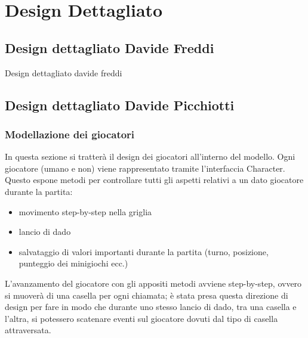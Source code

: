 \documentclass[a4paper,12pt]{report}
\begin{document}
	\section{Design Dettagliato}
	\subsection{Design dettagliato Davide Freddi}
	Design dettagliato davide freddi
	\subsection{Design dettagliato Davide Picchiotti}
	\subsubsection{Modellazione dei giocatori}
	In questa sezione si tratterà il design dei giocatori all'interno del modello.\newline
	\newline
	Ogni giocatore (umano e non) viene rappresentato tramite l'interfaccia Character.
	Questo espone metodi per controllare tutti gli aspetti relativi a un dato giocatore durante la partita:
	\begin{itemize}
		\item movimento step-by-step nella griglia
	    \item lancio di dado
	    \item salvataggio di valori importanti durante la partita (turno, posizione, punteggio dei minigiochi ecc.)
	\end{itemize}
	L'avanzamento del giocatore con gli appositi metodi avviene step-by-step, ovvero si muoverà di una
	casella per ogni chiamata; è stata presa questa direzione di design per fare in modo che durante
	uno stesso lancio di dado, tra una casella e l'altra, si potessero scatenare eventi sul giocatore
	dovuti dal tipo di casella attraversata.\newline
\end{document}
